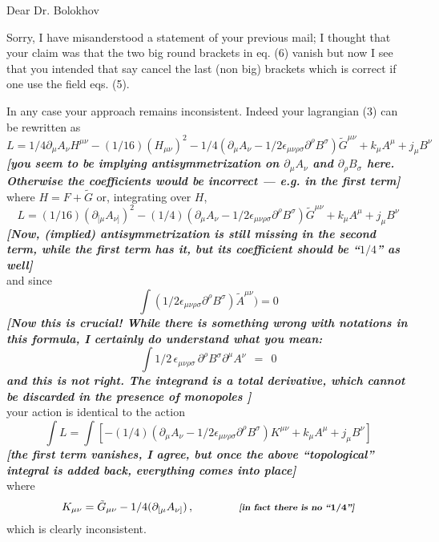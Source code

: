 \documentclass[epsfig,12pt]{article}
\begin{document}
	Dear  Dr. Bolokhov

	Sorry,  I  have misanderstood  a  statement  of  your  previous  mail; 
	I  thought that  your  claim  was  that  the  two  big  round  brackets  in eq. (6)  vanish  
	but  now  I see  that  you intended  that  say  cancel  the  last  (non  big)  brackets
	which  is  correct  if  one  use the field  eqs. (5).

	In any  case  your  approach  remains inconsistent.
	Indeed  your  lagrangian  (3)  can  be  rewritten  as 
\[
	L =  1/4 \partial_{\mu} A_{\nu}H^{\mu\nu} - (1/16)( H_{\mu\nu})^2
		- 1/4 ( \partial_{\mu}A_{\nu} - 1/2 \epsilon_{\mu\nu\rho\sigma}\partial^{\rho}B^{\sigma}) \tilde G^{\mu\nu}  
		+ k_{\mu}A^{\mu} + j_{\mu}B^{\nu}
\]
\textsl{\textbf{\footnotesize [you seem to be implying antisymmetrization on 
{\boldmath $ \partial_\mu A_\nu $} and {\boldmath $ \partial_\rho B_\sigma $} here.
	Otherwise the coefficients would be incorrect --- e.g. in the first term]}}\\
	where  $ H =  F + \tilde G $
	or,   integrating  over   $ H $,  
\[
	L =  (1/16 )(\partial_{[ \mu} A_{\nu ]})^2
	- (1/4 )( \partial_{\mu}A_{\nu} - 1/2 \epsilon_{\mu\nu\rho\sigma}\partial^{\rho}B^{\sigma}) \tilde G^{\mu\nu} 
	+ k_{\mu}A^{\mu} + j_{\mu}B^{\nu} 
\]
\textsl{\textbf{\footnotesize [Now, (implied) antisymmetrization is still missing in the second term,
while the first term has it, but its coefficient should be ``{\boldmath $ 1/4 $}'' as well]}}\\
	and  since 
\[
	\int ( 1/2 \epsilon_{\mu\nu\rho\sigma}\partial^{\rho}B^{\sigma}) \tilde A^{\mu\nu})  =  0  
\]
\textsl{\textbf{\footnotesize [Now this is crucial! While there is something wrong with notations in this formula, 
	I certainly do understand what you mean:
{\boldmath
\[
	\int 1/2\, \epsilon_{\mu\nu\rho\sigma}\, \partial^{\rho}B^{\sigma} \partial^\mu A^\nu ~~=~~ 0
\]}
	and this is not right.
	The integrand is a total derivative, which cannot be discarded in the presence of monopoles
]}}\\
	your  action  is  identical  to  the  action  
\[
	\int L =  \int[  - (1/4 )( \partial_{\mu}A_{\nu} - 1/2 \epsilon_{\mu\nu\rho\sigma}\partial^{\rho}B^{\sigma}) K^{\mu\nu}  + 
	k_{\mu}A^{\mu} + j_{\mu}B^{\nu}]
\]
\textsl{\textbf{\footnotesize [the first term vanishes, I agree, 
	but once the above ``topological'' integral is added back, everything comes into place]}}\\
	where  
\[
	K_{\mu\nu} =  \tilde G_{\mu\nu} - 1/4 (\partial_{[ \mu} A_{\nu ]})\,,
	\qquad\qquad\textsl{\textbf{\footnotesize [in fact there is no ``{\boldmath $1/4$}'']}}\\
\]
which  is  clearly  inconsistent.
\end{document}
